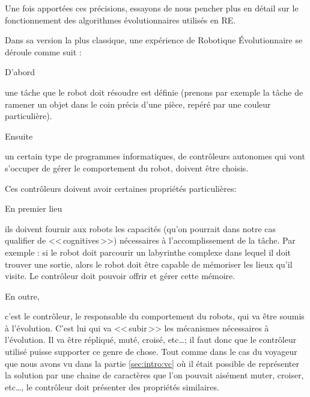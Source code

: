 Une fois apportées ces précisions, essayons de nous pencher plus en détail sur le fonctionnement des algorithmes évolutionnaires utilisés en RE.

Dans sa version la plus classique, une expérience de Robotique Évolutionnaire se déroule comme suit \citep[pour certains exemples historiques de la littératures]{nolfi96learning,floreano94automaticcreationofanautonomousagen,jakobi97evolutionaryroboticsandtheradicalenvelopeofnoisehypothesis}:

\begin{inparaenum}[(\itshape 1\upshape)]

D'abord \item une tâche que le robot doit résoudre est définie (prenons par exemple la tâche de ramener un objet dans le coin précis d'une pièce, repéré par une couleur particulière).

 

Ensuite \item un certain type de programmes informatiques, de contrôleurs autonomes qui vont s'occuper de gérer le comportement du robot, doivent être choisis.

Ces contrôleurs doivent avoir certaines propriétés particulières:

   \begin{inparaenum}

   En premier lieu \item ils doivent fournir aux robots les capacités (qu'on pourrait dans notre cas qualifier de <<\,cognitives\,>>) nécessaires à l'accomplissement de la tâche. Par exemple : si le robot doit parcourir un labyrinthe complexe dans lequel il doit trouver une sortie, alors le robot doit être capable de mémoriser les lieux qu'il visite. Le contrôleur doit pouvoir offrir et gérer cette mémoire.

   En outre,\item c'est le contrôleur, le responsable du comportement du robots, qui va être soumis à l'évolution. C'est lui qui va <<\,subir\,>> les mécanismes nécessaires à l'évolution. Il va être répliqué, muté, croisé, etc\ldots ; il faut donc que le contrôleur utilisé puisse supporter ce genre de chose. Tout comme dans le cas du voyageur que nous avons vu dans la partie \ref{sec:intro:vc} où il était possible de représenter la solution par une chaine de caractères que l'on pouvait aisément muter, croiser, etc\ldots, le contrôleur doit présenter des propriétés similaires.

   \end{inparaenum}


\end{inparaenum}
